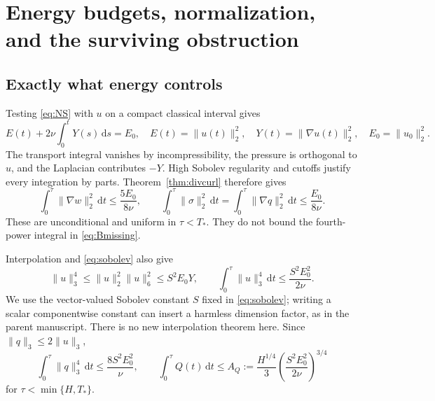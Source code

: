\documentclass[11pt,a4paper]{article}
\theoremstyle{definition}
\theoremstyle{remark}
\newcommand{\dd}{\,\mathrm d}
\newcommand{\norm}[1]{\lVert #1\rVert}
\numberwithin{equation}{section}
\begin{document}
\section{Energy budgets, normalization, and the surviving obstruction}\label{sec:budgets}
\subsection{Exactly what energy controls}
Testing \eqref{eq:NS} with \(u\) on a compact classical interval gives
\begin{equation}\label{eq:energy}
E(t)+2\nu\int_0^tY(s)\dd s=E_0,
\quad E(t)=\norm{u(t)}_2^2,
\quad Y(t)=\norm{\nabla u(t)}_2^2,
\quad E_0=\norm{u_0}_2^2.
\end{equation}
The transport integral vanishes by incompressibility, the pressure is orthogonal to \(u\), and the Laplacian contributes \(-Y\). High Sobolev regularity and cutoffs justify every integration by parts. Theorem~\ref{thm:divcurl} therefore gives
\begin{equation}\label{eq:energy-defect}
\int_0^\tau\norm{\nabla w}_2^2\dd t\le\frac{5E_0}{8\nu},
\qquad
\int_0^\tau\norm\sigma_2^2\dd t
=\int_0^\tau\norm{\nabla q}_2^2\dd t\le\frac{E_0}{8\nu}.
\end{equation}
These are unconditional and uniform in \(\tau<T_*\). They do not bound the fourth-power integral in \eqref{eq:Bmissing}.

Interpolation and \eqref{eq:sobolev} also give
\[
\norm u_3^4\le\norm u_2^2\norm u_6^2\le S^2E_0Y,
\qquad
\int_0^\tau\norm u_3^4\dd t\le\frac{S^2E_0^2}{2\nu}.
\]
We use the vector-valued Sobolev constant \(S\) fixed in \eqref{eq:sobolev}; writing a scalar componentwise constant can insert a harmless dimension factor, as in the parent manuscript. There is no new interpolation theorem here. Since \(\norm q_3\le2\norm u_3\),
\begin{equation}\label{eq:energy-Qq}
\int_0^\tau\norm q_3^4\dd t\le\frac{8S^2E_0^2}{\nu},
\qquad
\int_0^\tau Q(t)\dd t\le A_Q:=\frac{H^{1/4}}3
\left(\frac{S^2E_0^2}{2\nu}\right)^{3/4}
\end{equation}
for \(\tau<\min\{H,T_*\}\).
\end{document}
